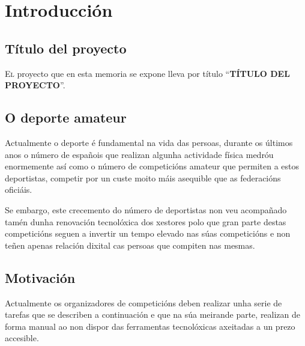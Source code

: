 \chapter{Introducción}
\minitoc
\label{chap:introduccion}


\section{Título del proyecto}

 \lettrine{E}{l} proyecto que en esta memoria se expone lleva por título
 ``\textbf{TÍTULO DEL PROYECTO}''.


 
  \section{O deporte amateur}
    Actualmente o deporte é fundamental na vida das persoas, durante os últimos anos o 
número de españois que realizan algunha actividade física medróu enormemente así como o 
número de competicións amateur que permiten a estos deportistas, competir por un custe 
moito máis asequible que as federacións oficiáis.

    Se embargo, este crecemento do número de deportistas non veu acompañado tamén dunha 
renovación tecnolóxica dos xestores polo que gran parte destas competicións seguen 
a invertir un tempo elevado nas súas competicións e non teñen apenas relación dixital cas 
persoas que compiten nas mesmas.

    \section{Motivación}
    Actualmente os organizadores de competicións deben realizar unha serie de tarefas que 
se describen a continuación e que na súa meirande parte, realizan de forma manual ao non 
dispor das ferramentas tecnolóxicas axeitadas a un prezo accesible.


